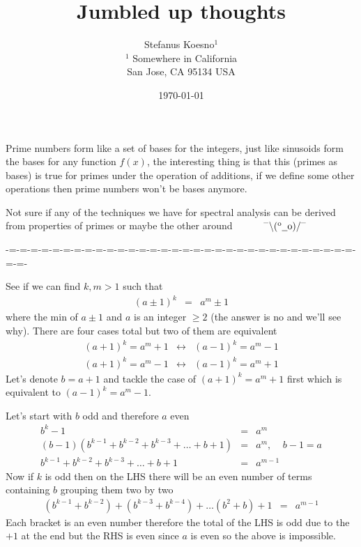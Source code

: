 \documentclass[aps,preprint,preprintnumbers,nofootinbib,showpacs,prd]{revtex4-1}
\newcommand{\nbea}{\begin{eqnarray*}}
\newcommand{\neea}{\end{eqnarray*}}
\newcommand{\dunno}{$ {}^{\mbox {--}}\backslash(^{\rm o}{}\underline{\hspace{0.2cm}}{\rm o})/^{\mbox {--}}$}
\begin{document}
\title{Jumbled up thoughts}
\bigskip
\author{Stefanus Koesno$^1$\\
$^1$ Somewhere in California\\ San Jose, CA 95134 USA\\
}
%
\date{\today}
%
\begin{abstract}

\end{abstract}
%
\maketitle

\renewcommand{\theequation}{A.\arabic{equation}}  %
\setcounter{equation}{0}  %


Prime numbers form like a set of bases for the integers, just like sinusoids form the bases for any function $f(x)$, the interesting thing is that this (primes as bases) is true for primes under the operation of additions, if we define some other operations then prime numbers won't be bases anymore.

Not sure if any of the techniques we have for spectral analysis can be derived from properties of primes or maybe the other around ~~~~~ \dunno

-=-=-=-=-=-=-=-=-=-=-=-=-=-=-=-=-=-=-=-=-=-=-=-=-=-=-=-=-=-=-=-=-=-=-


See if we can find $k,m > 1$ such that
%
\nbea
(a\pm1)^k & = & a^m \pm 1
\neea
%
where the min of $a \pm 1$ and $a$ is an integer $\ge 2$ (the answer is no and we'll see why). There are four cases total but two of them are equivalent
%
\nbea
(a + 1)^k = a^m + 1 & \longleftrightarrow & (a - 1)^k = a^m - 1 \\
(a + 1)^k = a^m - 1 & \longleftrightarrow & (a - 1)^k = a^m + 1
\neea
%
Let's denote $b = a + 1$ and tackle the case of $(a+1)^k = a^m + 1$ first which is equivalent to $(a - 1)^k = a^m - 1$.

Let's start with $b$ odd and therefore $a$ even
%
\nbea
b^k - 1 & = & a^m \\
(b-1)(b^{k-1} + b^{k-2} + b^{k-3} + \dots + b + 1) & = & a^m, ~~~~~ b-1 = a \\
b^{k-1} + b^{k-2} + b^{k-3} + \dots + b + 1 & = & a^{m-1}
\neea
%
Now if $k$ is odd then on the LHS there will be an even number of terms containing $b$ grouping them two by two
%
\nbea
(b^{k-1} + b^{k-2}) + (b^{k-3} + b^{k-4}) + \dots ( b^2+ b) + 1 & = & a^{m-1}
\neea
%
Each bracket is an even number therefore the total of the LHS is odd due to the $+1$ at the end but the RHS is even since $a$ is even so the above is impossible.
\end{document}
